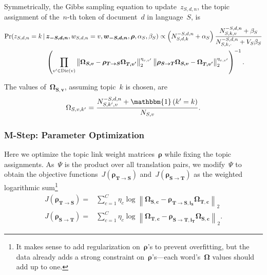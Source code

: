 \documentclass[paper=a4, fontsize=11pt]{article}
\newcommand{\ind}[1]{\mathbbm{1} \left( #1 \right)}
\begin{document}
Symmetrically, the Gibbs sampling equation to update~$z_{S,d,n}$, the topic assignment of the~$n$-th token of document~$d$ in language~$S$, is
\begin{align}
\Pr ( z_{S,d,n}=k \,|\, &\bm{z_{-S,d,n}}, w_{S,d,n}=v, \bm{w_{-S,d,n}}, \bm{\rho}, \alpha_S, \beta_S ) \propto \left( N_{S,d,k}^{-S,d,n}+\alpha_S \right) \frac{N_{S,k,v}^{-S,d,n}+\beta_S}{N_{S,k,\cdot}^{-S,d,n}+V_S\beta_S} \notag\\
&\left( \prod_{v' \in \text{Dic} (v)} \left\lVert \bm{\Omega_{S,v}} - \bm{\rho_{T \rightarrow S} \Omega_{T,v'}} \right\rVert_{2}^{\eta_{v,v'}} \left\lVert \bm{\rho_{S \rightarrow T} \Omega_{S,v}} - \bm{\Omega_{T,v'}} \right\rVert_{2}^{\eta_{v,v'}} \right)^{-1}. \label{equ:inf_s}
\end{align}

The values of~$\bm{\Omega_{S,v}}$, assuming topic~$k$ is chosen, are
\begin{equation}\label{equ:omega_s}
\Omega_{S,v,k'} = \frac{N_{S,k',v}^{-S,d,n} + \ind{k'=k}}{N_{S,v}}.
\end{equation}

\subsubsection{M-Step: Parameter Optimization}

Here we optimize the topic link weight matrices~$\bm{\rho}$ while fixing the topic assignments. As~$\Psi$ is the product over all translation pairs, we modify~$\Psi$ to obtain the objective functions~$J(\bm{\rho_{T \rightarrow S}})$ and~$J(\bm{\rho_{S \rightarrow T}})$ as the weighted logarithmic sum\footnote{It makes sense to add regularization on~$\bm{\rho}$'s to prevent overfitting, but the data already adds a strong constraint on~$\bm{\rho}$'s---each word's~$\bm{\Omega}$ values should add up to one.}
\begin{align}
J(\bm{\rho_{T \rightarrow S}}) =& \sum_{c=1}^{C} \eta_c \log \left\lVert \bm{\Omega_{S,c}} - \bm{\rho_{T \rightarrow S, i_S}} \bm{\Omega_{T,c}} \right\rVert_{2} \\
J(\bm{\rho_{S \rightarrow T}}) =& \sum_{c=1}^{C} \eta_c \log \left\lVert \bm{\Omega_{T,c}} - \bm{\rho_{S \rightarrow T, i_T}} \bm{\Omega_{S,c}} \right\rVert_{2}.
\end{align}
\end{document}
